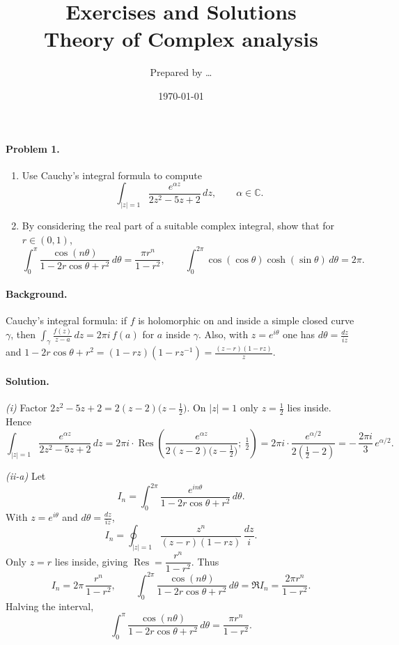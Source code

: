 \documentclass[11pt,a4paper]{article}
\title{Exercises and Solutions \\[0.5em]
	\large Theory of Complex analysis}
\author{Prepared by \dots}
\date{\today}
\theoremstyle{definition}
\theoremstyle{definition}
\theoremstyle{plain}
\theoremstyle{remark}
\DeclareMathOperator{\Res}{Res}
\begin{document}
	\maketitle
	
	

\paragraph{Problem 1.}
\begin{enumerate}[label=(\roman*)]
	\item Use Cauchy’s integral formula to compute
	\[
	\int_{|z|=1}\frac{e^{\alpha z}}{2z^{2}-5z+2}\,dz,\qquad \alpha\in\mathbb C.
	\]
	
	\item By considering the real part of a suitable complex integral, show that for $r\in(0,1)$,
	\[
	\int_{0}^{\pi}\frac{\cos(n\theta)}{1-2r\cos\theta+r^{2}}\,d\theta=\frac{\pi r^{n}}{1-r^{2}},
	\qquad
	\int_{0}^{2\pi}\cos(\cos\theta)\cosh(\sin\theta)\,d\theta=2\pi .
	\]
\end{enumerate}

\paragraph{Background.}
Cauchy’s integral formula: if $f$ is holomorphic on and inside a simple closed curve $\gamma$, then
$\displaystyle \int_\gamma \frac{f(z)}{z-a}\,dz=2\pi i\,f(a)$ for $a$ inside $\gamma$.
Also, with $z=e^{i\theta}$ one has $d\theta=\frac{dz}{iz}$ and
$1-2r\cos\theta+r^{2}=(1-rz)(1-rz^{-1})=\frac{(z-r)(1-rz)}{z}$.

\paragraph{Solution.}
\emph{(i)} Factor $2z^{2}-5z+2=2(z-2)\bigl(z-\tfrac12\bigr)$. On $|z|=1$ only $z=\tfrac12$ lies inside.
Hence
\[
\int_{|z|=1}\frac{e^{\alpha z}}{2z^{2}-5z+2}\,dz
=2\pi i\cdot \Res\!\left(\frac{e^{\alpha z}}{2(z-2)\bigl(z-\tfrac12\bigr)};\ \tfrac12\right)
=2\pi i\cdot \frac{e^{\alpha/2}}{2(\tfrac12-2)}
=-\,\frac{2\pi i}{3}\,e^{\alpha/2}.
\]

\medskip
\emph{(ii-a)} Let
\[
I_n=\int_{0}^{2\pi}\frac{e^{in\theta}}{1-2r\cos\theta+r^{2}}\,d\theta.
\]
With $z=e^{i\theta}$ and $d\theta=\frac{dz}{iz}$,
\[
I_n=\oint_{|z|=1}\frac{z^{n}}{(z-r)(1-rz)}\,\frac{dz}{i}.
\]
Only $z=r$ lies inside, giving $\Res=\dfrac{r^{n}}{1-r^{2}}$. Thus
\[
I_n=2\pi\,\frac{r^{n}}{1-r^{2}},\qquad
\int_{0}^{2\pi}\frac{\cos(n\theta)}{1-2r\cos\theta+r^{2}}\,d\theta
=\Re I_n=\frac{2\pi r^{n}}{1-r^{2}}.
\]
Halving the interval,
\[
\int_{0}^{\pi}\frac{\cos(n\theta)}{1-2r\cos\theta+r^{2}}\,d\theta
=\frac{\pi r^{n}}{1-r^{2}}.
\]
\end{document}
